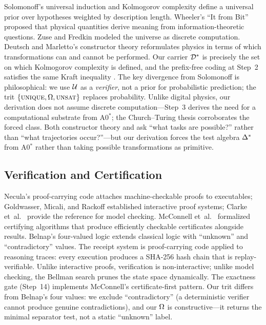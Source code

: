Solomonoff's universal induction \citep{solomonoff1964} and Kolmogorov
complexity \citep{kolmogorov1963,livitanyi2008} define a universal prior
over hypotheses weighted by description length.  Wheeler's ``It from
Bit'' \citep{wheeler1990} proposed that physical quantities derive meaning
from information-theoretic questions.  Zuse \citep{zuse1969} and
Fredkin \citep{fredkin2003} modeled the universe as discrete computation.
Deutsch and Marletto's constructor theory \citep{deutsch2015} reformulates
physics in terms of which transformations can and cannot be performed.
Our carrier $\mathcal{D}^*$ is precisely the set on which Kolmogorov complexity
is defined, and the prefix-free coding at Step~2 satisfies the same Kraft
inequality \citep{kraft1949}.  The key divergence from Solomonoff is
philosophical: we use $\mathcal{U}$ as a \emph{verifier}, not a prior for
probabilistic prediction; the trit $\{\textsc{unique}, \Omega, \textsc{unsat}\}$ replaces
probability.  Unlike digital physics, our derivation does not assume
discrete computation---Step~3 derives the need for a computational
substrate from A0$^*$; the Church--Turing thesis corroborates the forced class.
Both constructor theory and \Opoch{} ask ``what tasks are possible?'' rather
than ``what trajectories occur?''---but our derivation forces the test
algebra $\Delta^*$ from A0$^*$ rather than taking possible transformations as
primitive.

\subsection{Verification and Certification}
\label{sec:related:verification}

Necula's proof-carrying code \citep{necula1997} attaches machine-checkable
proofs to executables; Goldwasser, Micali, and
Rackoff \citep{goldwasser1989} established interactive proof systems;
Clarke et~al.\ \citep{clarke2018} provide the reference for model checking.
McConnell et~al.\ \citep{mcconnell2011} formalized certifying algorithms
that produce efficiently checkable certificates alongside results.
Belnap's four-valued logic \citep{belnap1977} extends classical logic with
``unknown'' and ``contradictory'' values.  The \Opoch{} receipt system is
proof-carrying code applied to reasoning traces: every execution produces a
SHA-256 hash chain that is replay-verifiable.  Unlike interactive proofs,
verification is non-interactive; unlike model checking, the Bellman search
prunes the state space dynamically.  The exactness gate (Step~14) implements
McConnell's certificate-first pattern.  Our trit differs from Belnap's four
values: we exclude ``contradictory'' (a deterministic verifier cannot produce
genuine contradictions), and our $\Omega$ is constructive---it returns the
minimal separator test, not a static ``unknown'' label.

